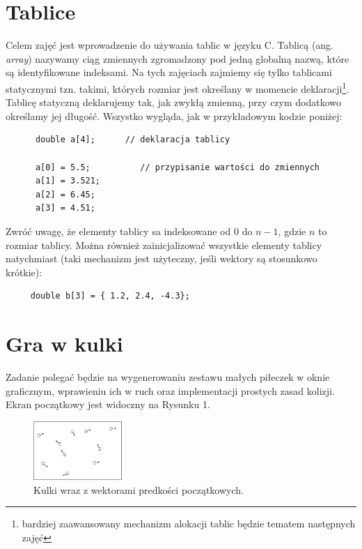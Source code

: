 \documentclass{instrukcja}
\begin{document}
\author{W. Regulski}
\materialtitle


\section*{Tablice}
Celem zajęć jest wprowadzenie do używania tablic w języku C. Tablicą (ang. {\it array}) nazywamy ciąg zmiennych zgromadzony pod jedną globalną nazwą, które są identyfikowane indeksami. 
Na tych zajęciach zajmiemy się tylko tablicami statycznymi tzn. takimi, których rozmiar jest określany w momencie deklaracji\footnote{bardziej zaawansowany mechanizm alokacji tablic będzie tematem następnych zajęć}.
Tablicę statyczną deklarujemy tak, jak zwykłą zmienną, przy czym dodatkowo określamy jej długość. Wszystko wygląda, jak w przykładowym kodzie poniżej:

\begin{verbatim}
      double a[4];    	// deklaracja tablicy

      a[0] = 5.5;		   // przypisanie wartości do zmiennych
      a[1] = 3.521;
      a[2] = 6.45;
      a[3] = 4.51;

\end{verbatim}
Zwróć uwagę, że elementy tablicy sa indeksowane od \(0\) do \(n-1\), gdzie \(n\) to rozmiar tablicy. Można również zainicjalizować wszystkie elementy tablicy natychmiast (taki mechanizm jest użyteczny, jeśli wektory są stosunkowo krótkie):
\begin{verbatim}
     double b[3] = { 1.2, 2.4, -4.3};
\end{verbatim}
\section*{Gra w kulki}

Zadanie polegać będzie na wygenerowaniu zestawu małych piłeczek w oknie graficznym, wprawieniu ich w ruch oraz implementacji prostych zasad kolizji. Ekran początkowy jest widoczny na Rysunku 1.
\begin{figure}
\centering
\includegraphics[width=0.3\textwidth]{kulki.pdf}

\caption{Kulki wraz z wektorami predkości początkowych.}
\end{figure}
\end{document}
